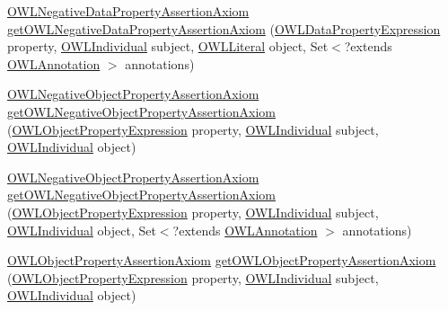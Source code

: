 \begin{DoxyCompactItemize}
\item 
\hyperlink{interfaceorg_1_1semanticweb_1_1owlapi_1_1model_1_1_o_w_l_negative_data_property_assertion_axiom}{O\-W\-L\-Negative\-Data\-Property\-Assertion\-Axiom} \hyperlink{classuk_1_1ac_1_1manchester_1_1cs_1_1owl_1_1owlapi_1_1_o_w_l_data_factory_impl_a1007cce394530982e9f16efec820600e}{get\-O\-W\-L\-Negative\-Data\-Property\-Assertion\-Axiom} (\hyperlink{interfaceorg_1_1semanticweb_1_1owlapi_1_1model_1_1_o_w_l_data_property_expression}{O\-W\-L\-Data\-Property\-Expression} property, \hyperlink{interfaceorg_1_1semanticweb_1_1owlapi_1_1model_1_1_o_w_l_individual}{O\-W\-L\-Individual} subject, \hyperlink{interfaceorg_1_1semanticweb_1_1owlapi_1_1model_1_1_o_w_l_literal}{O\-W\-L\-Literal} object, Set$<$?extends \hyperlink{interfaceorg_1_1semanticweb_1_1owlapi_1_1model_1_1_o_w_l_annotation}{O\-W\-L\-Annotation} $>$ annotations)
\item 
\hyperlink{interfaceorg_1_1semanticweb_1_1owlapi_1_1model_1_1_o_w_l_negative_object_property_assertion_axiom}{O\-W\-L\-Negative\-Object\-Property\-Assertion\-Axiom} \hyperlink{classuk_1_1ac_1_1manchester_1_1cs_1_1owl_1_1owlapi_1_1_o_w_l_data_factory_impl_a691c1b54a258eaa167fb76e16a9c7230}{get\-O\-W\-L\-Negative\-Object\-Property\-Assertion\-Axiom} (\hyperlink{interfaceorg_1_1semanticweb_1_1owlapi_1_1model_1_1_o_w_l_object_property_expression}{O\-W\-L\-Object\-Property\-Expression} property, \hyperlink{interfaceorg_1_1semanticweb_1_1owlapi_1_1model_1_1_o_w_l_individual}{O\-W\-L\-Individual} subject, \hyperlink{interfaceorg_1_1semanticweb_1_1owlapi_1_1model_1_1_o_w_l_individual}{O\-W\-L\-Individual} object)
\item 
\hyperlink{interfaceorg_1_1semanticweb_1_1owlapi_1_1model_1_1_o_w_l_negative_object_property_assertion_axiom}{O\-W\-L\-Negative\-Object\-Property\-Assertion\-Axiom} \hyperlink{classuk_1_1ac_1_1manchester_1_1cs_1_1owl_1_1owlapi_1_1_o_w_l_data_factory_impl_a2af1376497bab2c220e3695ef4c5a5b6}{get\-O\-W\-L\-Negative\-Object\-Property\-Assertion\-Axiom} (\hyperlink{interfaceorg_1_1semanticweb_1_1owlapi_1_1model_1_1_o_w_l_object_property_expression}{O\-W\-L\-Object\-Property\-Expression} property, \hyperlink{interfaceorg_1_1semanticweb_1_1owlapi_1_1model_1_1_o_w_l_individual}{O\-W\-L\-Individual} subject, \hyperlink{interfaceorg_1_1semanticweb_1_1owlapi_1_1model_1_1_o_w_l_individual}{O\-W\-L\-Individual} object, Set$<$?extends \hyperlink{interfaceorg_1_1semanticweb_1_1owlapi_1_1model_1_1_o_w_l_annotation}{O\-W\-L\-Annotation} $>$ annotations)
\item 
\hyperlink{interfaceorg_1_1semanticweb_1_1owlapi_1_1model_1_1_o_w_l_object_property_assertion_axiom}{O\-W\-L\-Object\-Property\-Assertion\-Axiom} \hyperlink{classuk_1_1ac_1_1manchester_1_1cs_1_1owl_1_1owlapi_1_1_o_w_l_data_factory_impl_a21283e56b12cbf6e4cd36bd3b33ad09a}{get\-O\-W\-L\-Object\-Property\-Assertion\-Axiom} (\hyperlink{interfaceorg_1_1semanticweb_1_1owlapi_1_1model_1_1_o_w_l_object_property_expression}{O\-W\-L\-Object\-Property\-Expression} property, \hyperlink{interfaceorg_1_1semanticweb_1_1owlapi_1_1model_1_1_o_w_l_individual}{O\-W\-L\-Individual} subject, \hyperlink{interfaceorg_1_1semanticweb_1_1owlapi_1_1model_1_1_o_w_l_individual}{O\-W\-L\-Individual} object)

\end{DoxyCompactItemize}
